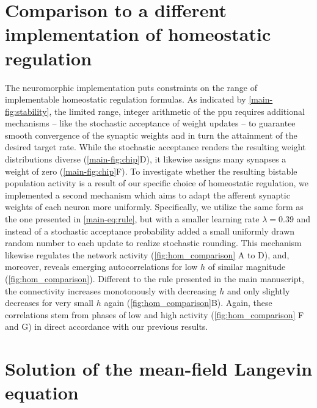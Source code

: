 \section{Comparison to a different implementation of homeostatic regulation \label{sec:hom_comparison}}

The neuromorphic implementation puts constraints on the range of implementable homeostatic regulation formulas.
As indicated by \cref{main-fig:stability}, the limited range, integer arithmetic of the \gls{ppu} requires additional mechanisms -- like the stochastic acceptance of weight updates -- to guarantee smooth convergence of the synaptic weights and in turn the attainment of the desired target rate.
While the stochastic acceptance renders the resulting weight distributions diverse (\cref{main-fig:chip}D), it likewise assigns many synapses a weight of zero (\cref{main-fig:chip}F).
To investigate whether the resulting bistable population activity is a result of our specific choice of homeostatic regulation, we implemented a second mechanism which aims to adapt the afferent synaptic weights of each neuron more uniformly.
Specifically, we utilize the same form as the one presented in \cref{main-eq:rule}, but with a smaller learning rate $\lambda = 0.39$ and instead of a stochastic acceptance probability added a small uniformly drawn random number to each update to realize stochastic rounding.
This mechanism likewise regulates the network activity (\cref{fig:hom_comparison} A to D), and, moreover, reveals emerging autocorrelations for low $h$ of similar magnitude (\cref{fig:hom_comparison}).
Different to the rule presented in the main manuscript, the connectivity increases monotonously with decreasing $h$ and only slightly decreases for very small $h$ again (\cref{fig:hom_comparison}B).
Again, these correlations stem from phases of low and high activity (\cref{fig:hom_comparison} F and G) in direct accordance with our previous results.


\section{Solution of the mean-field Langevin equation}

